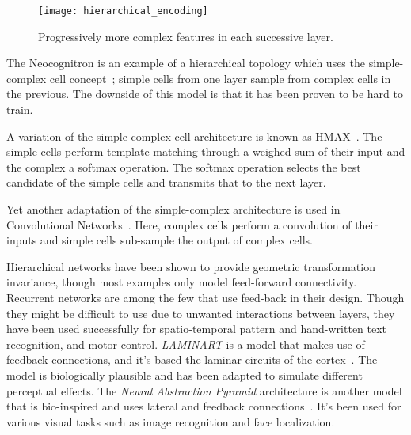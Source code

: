 \begin{figure}[h]
  \begin{center}
    \texttt{[image: hierarchical\_encoding]}
    \caption{Progressively more complex features in each successive layer.}
    \label{fig:vision:hierarchical_encoding}
  \end{center}
\end{figure}

The Neocognitron is an example of a hierarchical topology which uses the simple-complex cell concept~\cite{fukushima1988neocognitron}; simple cells from one layer sample from complex cells in the previous. The downside of this model is that it has been proven to be hard to train.

A variation of the simple-complex cell architecture is known as HMAX~\cite{riesenhuber1999hierarchical}. The simple cells perform template matching through a weighed sum of their input and the complex a softmax operation. The softmax operation selects the best candidate of the simple cells and transmits that to the next layer.

Yet another adaptation of the simple-complex architecture is used in Convolutional Networks~\cite{lecun-1990handwritten}. Here, complex cells perform a convolution of their inputs and simple cells sub-sample the output of complex cells.

Hierarchical networks have been shown to provide geometric transformation invariance, though most examples only model feed-forward connectivity. Recurrent networks are among the few that use feed-back in their design. Though they might be difficult to use due to unwanted interactions between layers, they have been used successfully for spatio-temporal pattern and hand-written text recognition, and motor control. \emph{LAMINART} is a model that makes use of feedback connections, and it's based the laminar circuits of the cortex~\cite{raizada2003laminart}. The model is biologically plausible and has been adapted to simulate different perceptual effects. The \emph{Neural Abstraction Pyramid} architecture is another model that is bio-inspired and uses lateral and feedback connections~\cite{behnke2003hierarchical}. It's been used for various visual tasks such as image recognition and face localization.
